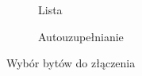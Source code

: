 \documentclass[12pt,a4paper]{article} %
\begin{document}
            
            \begin{figure}[h!]
            \centering
            \begin{subfigure}{.45\textwidth}
              \centering
              \caption{Lista}
            \end{subfigure}
            \begin{subfigure}{.45\textwidth}
              \centering
              \caption{Autouzupełnianie}
            \end{subfigure}
            \caption{Wybór bytów do złączenia}
            \label{fig:input}
            \end{figure}
            
\end{document}
